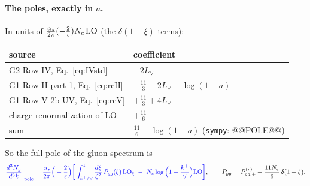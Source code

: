 \documentclass[10pt]{article}
\numberwithin{equation}{section}
\newcommand{\new}[1]{{\color{blue}#1}}
\newcommand{\Lv}{L_{\vee}}
\begin{document}
\paragraph{The poles, exactly in $a$.} In units of $\frac{\alpha_s}{2\pi}(-\frac2\epsilon)N_c\,{\rm LO}$ (the $\delta(1-\xi)$ terms):
\begin{table}[H]\centering\small
\begin{tabular}{@{}ll@{}}\toprule
source & coefficient\\\midrule
G2 Row IV, Eq.~\eqref{eq:IVstd} & $-2\Lv$\\
G1 Row II part 1, Eq.~\eqref{eq:rcII} & $-\frac{11}{3}-2\Lv-\log(1-a)$\\
G1 Row V 2b UV, Eq.~\eqref{eq:rcV} & $+\frac{11}{3}+4\Lv$\\
charge renormalization of LO & $+\frac{11}{6}$\\\midrule
sum & \new{$\frac{11}{6}-\log(1-a)$} \quad(\texttt{sympy}: @@POLE@@)\\\bottomrule
\end{tabular}
\end{table}
So the full pole of the gluon spectrum is
\begin{equation}
\new{\frac{d^3N_g}{d^3k}\bigg|_{\rm pole}=\frac{\alpha_s}{2\pi}\Big(-\frac{2}{\epsilon}\Big)\bigg[\int_{k^+/\vee}^1\frac{d\xi}{\xi^2}\,P_{gg}(\xi)\,{\rm LO}_\xi\;-\;N_c\log\Big(1-\frac{k^+}{\vee}\Big){\rm LO}\bigg]},\qquad P_{gg}=P^{(r)}_{gg,+}+\frac{11N_c}{6}\,\delta(1-\xi).
\label{eq:pole}
\end{equation}
\end{document}
